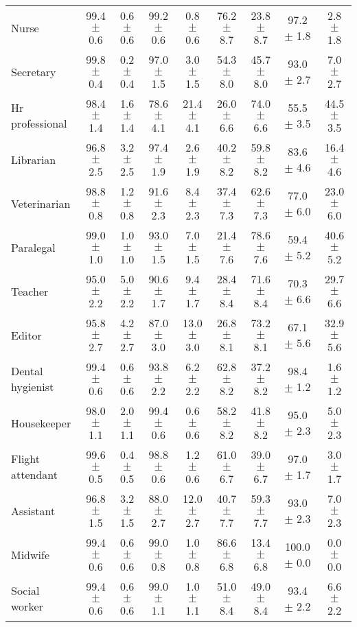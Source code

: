 \begin{table*}[p]
{\begin{tabular}{l|cc|cc|cc|cc}
Nurse
& 99.4 $\pm$ 0.6 & 0.6 $\pm$ 0.6
& 99.2 $\pm$ 0.6 & 0.8 $\pm$ 0.6
& 76.2 $\pm$ 8.7 & 23.8 $\pm$ 8.7
& 97.2 $\pm$ 1.8 & 2.8 $\pm$ 1.8
\\
Secretary
& 99.8 $\pm$ 0.4 & 0.2 $\pm$ 0.4
& 97.0 $\pm$ 1.5 & 3.0 $\pm$ 1.5
& 54.3 $\pm$ 8.0 & 45.7 $\pm$ 8.0
& 93.0 $\pm$ 2.7 & 7.0 $\pm$ 2.7
\\
Hr professional
& 98.4 $\pm$ 1.4 & 1.6 $\pm$ 1.4
& 78.6 $\pm$ 4.1 & 21.4 $\pm$ 4.1
& 26.0 $\pm$ 6.6 & 74.0 $\pm$ 6.6
& 55.5 $\pm$ 3.5 & 44.5 $\pm$ 3.5
\\
Librarian
& 96.8 $\pm$ 2.5 & 3.2 $\pm$ 2.5
& 97.4 $\pm$ 1.9 & 2.6 $\pm$ 1.9
& 40.2 $\pm$ 8.2 & 59.8 $\pm$ 8.2
& 83.6 $\pm$ 4.6 & 16.4 $\pm$ 4.6
\\
Veterinarian
& 98.8 $\pm$ 0.8 & 1.2 $\pm$ 0.8
& 91.6 $\pm$ 2.3 & 8.4 $\pm$ 2.3
& 37.4 $\pm$ 7.3 & 62.6 $\pm$ 7.3
& 77.0 $\pm$ 6.0 & 23.0 $\pm$ 6.0
\\
Paralegal
& 99.0 $\pm$ 1.0 & 1.0 $\pm$ 1.0
& 93.0 $\pm$ 1.5 & 7.0 $\pm$ 1.5
& 21.4 $\pm$ 7.6 & 78.6 $\pm$ 7.6
& 59.4 $\pm$ 5.2 & 40.6 $\pm$ 5.2
\\
Teacher
& 95.0 $\pm$ 2.2 & 5.0 $\pm$ 2.2
& 90.6 $\pm$ 1.7 & 9.4 $\pm$ 1.7
& 28.4 $\pm$ 8.4 & 71.6 $\pm$ 8.4
& 70.3 $\pm$ 6.6 & 29.7 $\pm$ 6.6
\\
Editor
& 95.8 $\pm$ 2.7 & 4.2 $\pm$ 2.7
& 87.0 $\pm$ 3.0 & 13.0 $\pm$ 3.0
& 26.8 $\pm$ 8.1 & 73.2 $\pm$ 8.1
& 67.1 $\pm$ 5.6 & 32.9 $\pm$ 5.6
\\
Dental hygienist
& 99.4 $\pm$ 0.6 & 0.6 $\pm$ 0.6
& 93.8 $\pm$ 2.2 & 6.2 $\pm$ 2.2
& 62.8 $\pm$ 8.2 & 37.2 $\pm$ 8.2
& 98.4 $\pm$ 1.2 & 1.6 $\pm$ 1.2
\\
Housekeeper
& 98.0 $\pm$ 1.1 & 2.0 $\pm$ 1.1
& 99.4 $\pm$ 0.6 & 0.6 $\pm$ 0.6
& 58.2 $\pm$ 8.2 & 41.8 $\pm$ 8.2
& 95.0 $\pm$ 2.3 & 5.0 $\pm$ 2.3
\\
Flight attendant
& 99.6 $\pm$ 0.5 & 0.4 $\pm$ 0.5
& 98.8 $\pm$ 0.6 & 1.2 $\pm$ 0.6
& 61.0 $\pm$ 6.7 & 39.0 $\pm$ 6.7
& 97.0 $\pm$ 1.7 & 3.0 $\pm$ 1.7
\\
Assistant
& 96.8 $\pm$ 1.5 & 3.2 $\pm$ 1.5
& 88.0 $\pm$ 2.7 & 12.0 $\pm$ 2.7
& 40.7 $\pm$ 7.7 & 59.3 $\pm$ 7.7
& 93.0 $\pm$ 2.3 & 7.0 $\pm$ 2.3
\\
Midwife
& 99.4 $\pm$ 0.6 & 0.6 $\pm$ 0.6
& 99.0 $\pm$ 0.8 & 1.0 $\pm$ 0.8
& 86.6 $\pm$ 6.8 & 13.4 $\pm$ 6.8
& 100.0 $\pm$ 0.0 & 0.0 $\pm$ 0.0
\\
Social worker
& 99.4 $\pm$ 0.6 & 0.6 $\pm$ 0.6
& 99.0 $\pm$ 1.1 & 1.0 $\pm$ 1.1
& 51.0 $\pm$ 8.4 & 49.0 $\pm$ 8.4
& 93.4 $\pm$ 2.2 & 6.6 $\pm$ 2.2
\\

\end{tabular}}
\end{table*}
